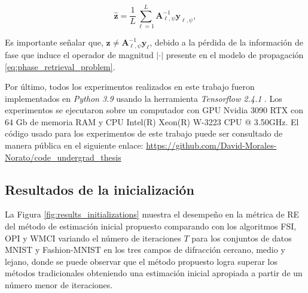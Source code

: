 \begin{equation}
    \hat{\mathbf{z}}= \frac{1}{L}\sum_{\ell=1}^{ L} \mathbf{A}_{\ell, \psi}^{-1}\mathbf{y}_{\ell, \psi},
    \label{eq:back_propagation}
\end{equation}

Es importante señalar que, $\mathbf{z} \neq \mathbf{A}_{\ell, \psi}^{-1}\mathbf{y}_{\ell}$, debido a la pérdida de la información de fase que induce el operador de magnitud $\vert \cdot \vert$ presente en el modelo de propagación \eqref{eq:phase_retrieval_problem}.


Por último, todos los experimentos realizados en este trabajo fueron implementados en \textit{Python 3.9} usando la herramienta \textit{Tensorflow 2.4.1}  . Los experimentos se ejecutaron sobre un computador con GPU Nvidia 3090 RTX con 64 Gb de memoria RAM y CPU Intel(R) Xeon(R) W-3223 CPU @ 3.50GHz. El código usado para los experimentos de este trabajo puede ser consultado de manera pública en el siguiente enlace: \href{https://github.com/David-Morales-Norato/code_undergrad_thesis}{https://github.com/David-Morales-Norato/code\_undergrad\_thesis}

\begin{table}[!h]
\centering
\caption{ Parámetros de propagación usados para simular el modelo de propagación \eqref{eq:phase_retrieval_problem} para cada campo de difracción.}
\label{tab:parameters}
\end{table}


\subsection{Resultados de la inicialización}


La Figura \ref{fig:results_initializations} muestra el desempeño en la métrica de RE del método de estimación inicial propuesto comparando con los algoritmos FSI, OPI y WMCI variando el número de iteraciones $T$ para los conjuntos de datos MNIST y Fashion-MNIST en los tres campos de difracción cercano, medio y lejano, donde se puede observar que el método propuesto logra superar los métodos tradicionales obteniendo una estimación inicial apropiada a partir de un número menor de iteraciones.

